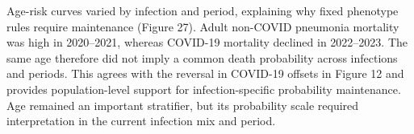 \documentclass[11pt,a4paper]{article}
\newcommand{\subheading}[1]{\par\needspace{3\baselineskip}\vspace{5pt}{\bfseries #1}\par\vspace{1pt}}
\begin{document}
\subheading{Figure 27. Observed deaths per 100 admissions by age, infection group and period, with 95\% interval bands.}
Age-risk curves varied by infection and period, explaining why fixed phenotype rules require maintenance (Figure 27). Adult non-COVID pneumonia mortality was high in 2020–2021, whereas COVID-19 mortality declined in 2022–2023. The same age therefore did not imply a common death probability across infections and periods. This agrees with the reversal in COVID-19 offsets in Figure 12 and provides population-level support for infection-specific probability maintenance. Age remained an important stratifier, but its probability scale required interpretation in the current infection mix and period.
\end{document}
